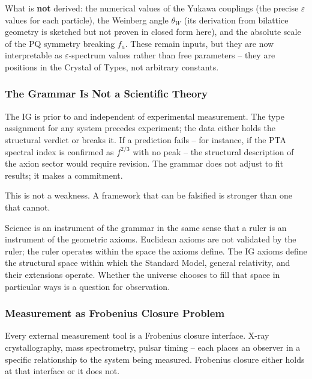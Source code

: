 \documentclass[12pt,a4paper]{article}
\begin{document}
What is \textbf{not} derived: the numerical values of the Yukawa
couplings (the precise \(\varepsilon\) values for each particle), the
Weinberg angle \(\theta_W\) (its derivation from bilattice geometry is
sketched but not proven in closed form here), and the absolute scale of
the PQ symmetry breaking \(f_a\). These remain inputs, but they are now
interpretable as \(\varepsilon\)-spectrum values rather than free
parameters -- they are positions in the Crystal of Types, not arbitrary
constants.

\hypertarget{the-grammar-is-not-a-scientific-theory}{%
\subsubsection{The Grammar Is Not a Scientific
Theory}\label{the-grammar-is-not-a-scientific-theory}}

The IG is prior to and independent of experimental measurement. The type
assignment for any system precedes experiment; the data either holds the
structural verdict or breaks it. If a prediction fails -- for instance,
if the PTA spectral index is confirmed as \(f^{2/3}\) with no peak --
the structural description of the axion sector would require revision.
The grammar does not adjust to fit results; it makes a commitment.

This is not a weakness. A framework that can be falsified is stronger
than one that cannot.

Science is an instrument of the grammar in the same sense that a ruler
is an instrument of the geometric axioms. Euclidean axioms are not
validated by the ruler; the ruler operates within the space the axioms
define. The IG axioms define the structural space within which the
Standard Model, general relativity, and their extensions operate.
Whether the universe chooses to fill that space in particular ways is a
question for observation.

\hypertarget{measurement-as-frobenius-closure-problem}{%
\subsubsection{Measurement as Frobenius Closure
Problem}\label{measurement-as-frobenius-closure-problem}}

Every external measurement tool is a Frobenius closure interface. X-ray
crystallography, mass spectrometry, pulsar timing -- each places an
observer in a specific relationship to the system being measured.
Frobenius closure either holds at that interface or it does not.
\end{document}
